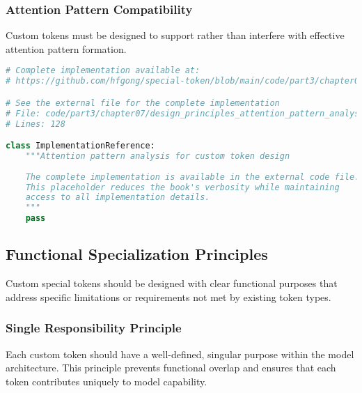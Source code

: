 \subsubsection{Attention Pattern Compatibility}

Custom tokens must be designed to support rather than interfere with effective attention pattern formation.

\begin{lstlisting}[language=Python, caption={Attention pattern analysis for custom token design}]
# Complete implementation available at:
# https://github.com/hfgong/special-token/blob/main/code/part3/chapter07/design_principles_attention_pattern_analysis_for.py

# See the external file for the complete implementation
# File: code/part3/chapter07/design_principles_attention_pattern_analysis_for.py
# Lines: 128

class ImplementationReference:
    """Attention pattern analysis for custom token design
    
    The complete implementation is available in the external code file.
    This placeholder reduces the book's verbosity while maintaining
    access to all implementation details.
    """
    pass
\end{lstlisting}

\subsection{Functional Specialization Principles}

Custom special tokens should be designed with clear functional purposes that address specific limitations or requirements not met by existing token types.

\subsubsection{Single Responsibility Principle}

Each custom token should have a well-defined, singular purpose within the model architecture. This principle prevents functional overlap and ensures that each token contributes uniquely to model capability.
\begin{comment}
Feedback: A "do this, not that" example would be very effective here. For example: "DO: Create a `<QUESTION_START>` token for question answering and a separate `<SUMMARY_START>` token for summarization. DON'T: Create a single `<TASK_START>` token and expect the model to infer the task from the context. Giving each token a single, clear job makes the model's learning task easier and the resulting system more robust."
\end{comment}

